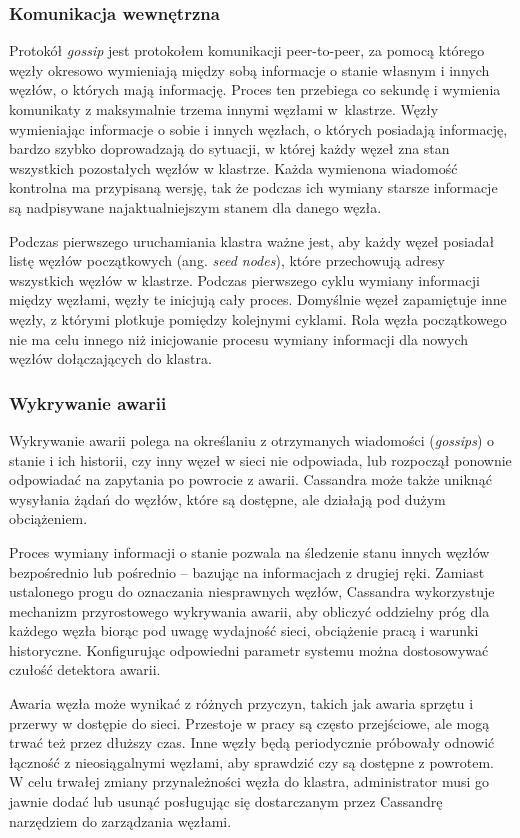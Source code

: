 \subsubsection{Komunikacja wewnętrzna}

Protokół \textit{gossip} jest protokołem komunikacji peer-to-peer, za pomocą którego węzły okresowo wymieniają między sobą informacje o stanie własnym i innych węzłów, o których mają informację. 
Proces ten przebiega co sekundę i wymienia komunikaty z maksymalnie trzema innymi węzłami w~klastrze.
Węzły wymieniając informacje o sobie i innych węzłach, o których posiadają informację, bardzo szybko doprowadzają do sytuacji, w której każdy węzeł zna stan wszystkich pozostałych węzłów w klastrze.
Każda wymienona wiadomość kontrolna ma przypisaną wersję, tak że podczas ich wymiany starsze informacje są nadpisywane najaktualniejszym stanem dla danego węzła. 

Podczas pierwszego uruchamiania klastra ważne jest, aby każdy węzeł posiadał listę węzłów początkowych (ang. \textit{seed nodes}), które przechowują adresy wszystkich węzłów w klastrze.
Podczas pierwszego cyklu wymiany informacji między węzłami, węzły te inicjują cały proces.
Domyślnie węzeł zapamiętuje inne węzły, z którymi plotkuje pomiędzy kolejnymi cyklami.
Rola węzła początkowego nie ma celu innego niż inicjowanie procesu wymiany informacji dla nowych węzłów dołączających do klastra.

\subsubsection{Wykrywanie awarii}

Wykrywanie awarii polega na określaniu z otrzymanych wiadomości (\textit{gossips}) o stanie i ich historii, czy inny węzeł w sieci nie odpowiada, lub rozpoczął ponownie odpowiadać na zapytania po powrocie z awarii.
Cassandra może także uniknąć wysyłania żądań do węzłów, które są dostępne, ale działają pod dużym obciążeniem.

Proces wymiany informacji o stanie pozwala na śledzenie stanu innych węzłów bezpośrednio lub pośrednio -- bazując na informacjach z drugiej ręki.
Zamiast ustalonego progu do oznaczania niesprawnych węzłów, Cassandra wykorzystuje mechanizm przyrostowego wykrywania awarii, aby obliczyć oddzielny próg dla każdego węzła biorąc pod uwagę wydajność sieci, obciążenie pracą i warunki historyczne.
Konfigurując odpowiedni parametr systemu można dostosowywać czułość detektora awarii.

Awaria węzła może wynikać z różnych przyczyn, takich jak awaria sprzętu i przerwy w dostępie do sieci.
Przestoje w pracy są często przejściowe, ale mogą trwać też przez dłuższy czas.
Inne węzły będą periodycznie próbowały odnowić łączność z nieosiągalnymi węzłami, aby sprawdzić czy są dostępne z powrotem.
W celu trwałej zmiany przynależności węzła do klastra, administrator musi go jawnie dodać lub usunąć posługując się dostarczanym przez Cassandrę narzędziem do zarządzania węzłami.

